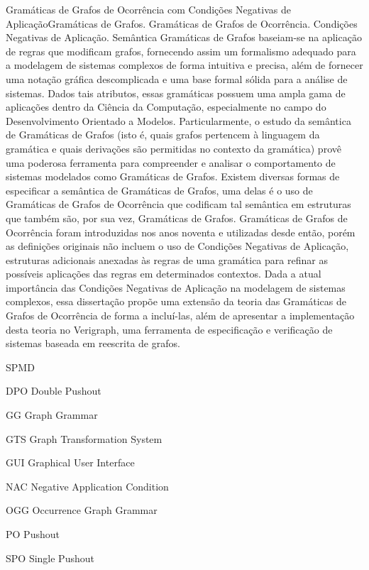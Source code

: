 \documentclass[ppgc,diss,english,openright]{iiufrgs}
\theoremstyle{plain}
\theoremstyle{definition}
\begin{document}
\begin{englishabstract}{Gramáticas de Grafos de Ocorrência com Condições Negativas de Aplicação}{Gramáticas de Grafos. Gramáticas de Grafos de Ocorrência. Condições Negativas de Aplicação. Semântica}
  Gramáticas de Grafos baseiam-se na aplicação de regras que modificam grafos, fornecendo assim um formalismo adequado para a modelagem de sistemas complexos de forma intuitiva e precisa, além de fornecer uma notação gráfica descomplicada e uma base formal sólida para a análise de sistemas. Dados tais atributos, essas gramáticas possuem uma ampla gama de aplicações dentro da Ciência da Computação, especialmente no campo do Desenvolvimento Orientado a Modelos. Particularmente, o estudo da semântica de
  Gramáticas de Grafos (isto é, quais grafos pertencem à linguagem da gramática e quais derivações são permitidas no contexto da gramática) provê uma poderosa ferramenta para compreender e analisar o comportamento de sistemas modelados como Gramáticas de Grafos. Existem diversas formas de especificar a semântica de Gramáticas de Grafos, uma delas é o uso de Gramáticas de Grafos de Ocorrência que codificam tal semântica em estruturas que também são, por sua vez, Gramáticas de Grafos. Gramáticas de
  Grafos de Ocorrência foram introduzidas nos anos noventa e utilizadas desde então, porém as definições originais não incluem o uso de Condições Negativas de Aplicação, estruturas adicionais anexadas às regras de uma gramática para refinar as possíveis aplicações das regras em determinados contextos. Dada a atual importância das Condições Negativas de Aplicação na modelagem de sistemas complexos, essa dissertação propõe uma extensão da teoria das Gramáticas de Grafos de Ocorrência de forma a
  incluí-las, além de apresentar a implementação desta teoria no Verigraph, uma ferramenta de especificação e verificação de sistemas baseada em reescrita de grafos.
\end{englishabstract}


\begin{listofabbrv}{SPMD}
   \item[DPO] Double Pushout
   \item[GG] Graph Grammar
   \item[GTS] Graph Transformation System
   \item[GUI] Graphical User Interface
   \item[NAC] Negative Application Condition
   \item[OGG] Occurrence Graph Grammar
   \item[PO] Pushout
   \item[SPO] Single Pushout
\end{listofabbrv}
\end{document}
